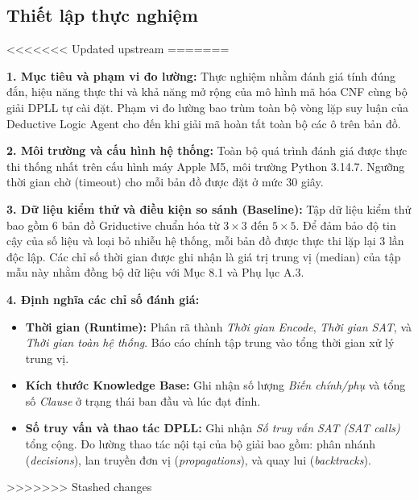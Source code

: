 \subsection{Thiết lập thực nghiệm}
<<<<<<< Updated upstream
=======

\textbf{1. Mục tiêu và phạm vi đo lường:}
Thực nghiệm nhằm đánh giá tính đúng đắn, hiệu năng thực thi và khả năng mở rộng của mô hình mã hóa CNF cùng bộ giải DPLL tự cài đặt. Phạm vi đo lường bao trùm toàn bộ vòng lặp suy luận của Deductive Logic Agent cho đến khi giải mã hoàn tất toàn bộ các ô trên bản đồ.

\textbf{2. Môi trường và cấu hình hệ thống:}
Toàn bộ quá trình đánh giá được thực thi thống nhất trên cấu hình máy Apple M5, môi trường Python 3.14.7. Ngưỡng thời gian chờ (timeout) cho mỗi bản đồ được đặt ở mức 30 giây.

\textbf{3. Dữ liệu kiểm thử và điều kiện so sánh (Baseline):}
Tập dữ liệu kiểm thử bao gồm 6 bản đồ Griductive chuẩn hóa từ $3\times3$ đến $5\times5$. Để đảm bảo độ tin cậy của số liệu và loại bỏ nhiễu hệ thống, mỗi bản đồ được thực thi lặp lại 3 lần độc lập. Các chỉ số thời gian được ghi nhận là giá trị trung vị (median) của tập mẫu này nhằm đồng bộ dữ liệu với Mục 8.1 và Phụ lục A.3.

\textbf{4. Định nghĩa các chỉ số đánh giá:}
\begin{itemize}
    \item \textbf{Thời gian (Runtime):} Phân rã thành \textit{Thời gian Encode}, \textit{Thời gian SAT}, và \textit{Thời gian toàn hệ thống}. Báo cáo chính tập trung vào tổng thời gian xử lý trung vị.
    \item \textbf{Kích thước Knowledge Base:} Ghi nhận số lượng \textit{Biến chính/phụ} và tổng số \textit{Clause} ở trạng thái ban đầu và lúc đạt đỉnh.
    \item \textbf{Số truy vấn và thao tác DPLL:} Ghi nhận \textit{Số truy vấn SAT (SAT calls)} tổng cộng. Đo lường thao tác nội tại của bộ giải bao gồm: phân nhánh (\textit{decisions}), lan truyền đơn vị (\textit{propagations}), và quay lui (\textit{backtracks}).
\end{itemize}
>>>>>>> Stashed changes

